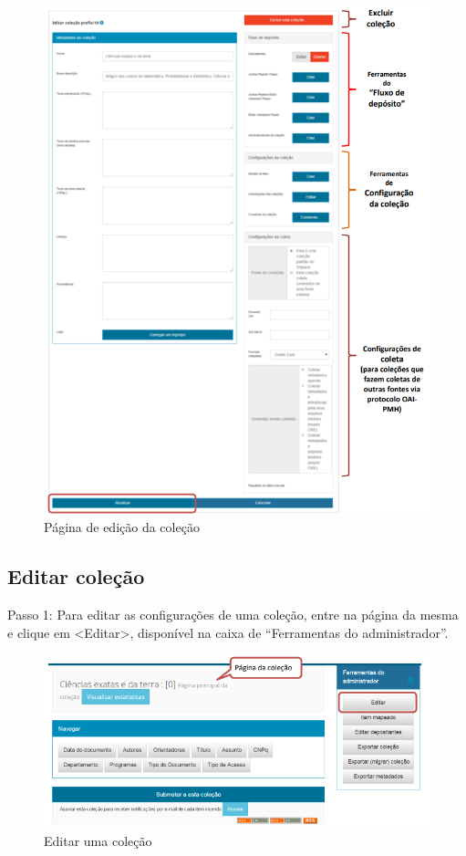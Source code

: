 \documentclass[12pt,hidelinks]{article}
\begin{document}
    \begin{figure}[!htp]
                \centering
                \includegraphics[scale=0.9]{figura/Figura39.png}
                \caption{Página de edição da coleção}
            \label{Rotulo}
        \end{figure}
    
\newpage

    \subsection{Editar coleção}
    
    Passo 1: Para editar as configurações de uma coleção, entre na página da mesma e clique em <Editar>, disponível na caixa de “Ferramentas do administrador”.
    
    \begin{figure}[!htp]
                \centering
                \includegraphics[scale=0.8]{figura/Figura40.png}
                \caption{Editar uma coleção}
            \label{Rotulo}
        \end{figure}
    
\end{document}
